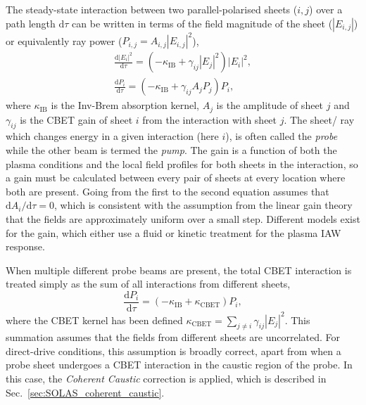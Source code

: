 The steady-state interaction between two parallel-polarised sheets ($i,j$) over a path length $\text{d}\tau$ can be written in terms of the field magnitude of the sheet ($|E_{i,j}|$) or equivalently ray power ($P_{i,j} = A_{i,j}|E_{i,j}|^2$),
\begin{equation}
    \label{eq:SOLAS_CBET_power_change}
    \begin{gathered}
        \frac{\text{d}|E_i|^2}{\text{d}\tau}= \left( -\kappa_{\text{IB}} + \gamma_{ij} |E_j|^2 \right) |E_i|^2, \\
        \frac{\text{d}P_i}{\text{d}\tau}= \left( -\kappa_{\text{IB}} + \gamma_{ij} A_j P_j \right) P_i,
    \end{gathered}
\end{equation}
where $\kappa_{\text{IB}}$ is the \ac{Inv-Brem} absorption kernel, $A_j$ is the amplitude of sheet $j$ and $\gamma_{ij}$ is the \ac{CBET} gain of sheet $i$ from the interaction with sheet $j$.
The sheet/ ray which changes energy in a given interaction (here $i$), is often called the \textit{probe} while the other beam is termed the \textit{pump}.
The gain is a function of both the plasma conditions and the local field profiles for both sheets in the interaction, so a gain must be calculated between every pair of sheets at every location where both are present.
Going from the first to the second equation assumes that $\text{d}A_i/\text{d}\tau=0$, which is consistent with the assumption from the linear gain theory that the fields are approximately uniform over a small step.
Different models exist for the gain, which either use a fluid or kinetic treatment for the plasma \ac{IAW} response.

When multiple different probe beams are present, the total \ac{CBET} interaction is treated simply as the sum of all interactions from different sheets,
\begin{equation}
    \label{eq:SOLAS_CBET_power_change_allsheets}
    \frac{\text{d}P_i}{\text{d}\tau}= \left( -\kappa_{\text{IB}} + \kappa_{\text{CBET}} \right) P_i,
\end{equation}
where the \ac{CBET} kernel has been defined $\kappa_{\text{CBET}} = \sum_{j\neq i} \gamma_{ij} |E_j|^2$.
This summation assumes that the fields from different sheets are uncorrelated.
For direct-drive conditions, this assumption is broadly correct, apart from when a probe sheet undergoes a \ac{CBET} interaction in the caustic region of the probe.
In this case, the \textit{Coherent Caustic} correction is applied, which is described in Sec.~\ref{sec:SOLAS_coherent_caustic}.

